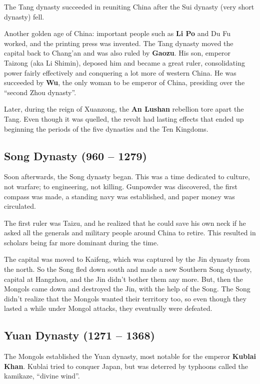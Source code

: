 The Tang dynasty succeeded in reuniting China after the Sui dynasty (very short dynasty) fell.

Another golden age of China: important people such as \textbf{Li Po} and Du Fu worked,
and the printing press was invented.
The Tang dynasty moved the capital back to Chang'an and was also ruled by \textbf{Gaozu}.
His son, emperor Taizong (aka Li Shimin), deposed him and became a great ruler,
consolidating power fairly effectively and conquering a lot more of western China.
He was succeeded by \textbf{Wu}, the only woman to be emperor of China,
presiding over the ``second Zhou dynasty''.

Later, during the reign of Xuanzong, the \textbf{An Lushan} rebellion tore apart the Tang.
Even though it was quelled, the revolt had lasting effects that ended up beginning the
periods of the five dynasties and the Ten Kingdoms.

\subsection*{Song Dynasty (960 -- 1279)}

Soon afterwards, the Song dynasty began.
This was a time dedicated to culture, not warfare;
to engineering, not killing.
Gunpowder was discovered, the first compass was made,
a standing navy was established, and paper money was circulated.

The first ruler was Taizu, and he realized that he could save his own neck if he
asked all the generals and military people around China to retire.
This resulted in scholars being far more dominant during the time.

The capital was moved to Kaifeng, which was captured by the Jin dynasty from the north.
So the Song fled down south and made a new Southern Song dynasty, capital at Hangzhou,
and the Jin didn't bother them any more.
But, then the Mongols came down and destroyed the Jin, with the help of the Song.
The Song didn't realize that the Mongols wanted their territory too,
so even though they lasted a while under Mongol attacks, they eventually were defeated.

\subsection*{Yuan Dynasty (1271 -- 1368)}

The Mongols established the Yuan dynasty, most notable for the emperor \textbf{Kublai Khan}.
Kublai tried to conquer Japan, but was deterred by typhoons called the kamikaze, ``divine wind''.

